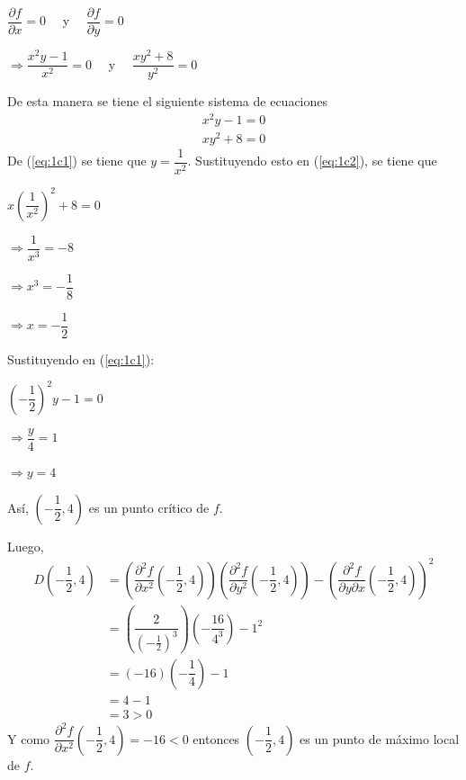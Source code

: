 \documentclass[fleqn, 12pt]{article}
\newcommand{\derivadaparcial}[2]{\dfrac{\partial {#1}}{\partial {#2}}}
\newcommand{\derivadaparcialn}[3]{\dfrac{\partial^{#3} {#1}}{\partial {#2}^{#3}}}
\newcommand{\derivadaparcialnd}[3]{\dfrac{\partial^{2} {#1}}{\partial {#3} \partial {#2}}}
\begin{document}
\begin{enumerate}
\begin{enumerate}
            $ \derivadaparcial{f}{x} = 0 \quad $ y $ \quad \derivadaparcial{f}{y} = 0 $

            $ \Longrightarrow \dfrac{x^2 y - 1}{x^2} = 0 \quad $ y $ \quad \dfrac{x y^2 + 8}{y^2} = 0 $

            De esta manera se tiene el siguiente sistema de ecuaciones
            \begin{align}
                x^2 y - 1 = 0 \label{eq:1c1} \\
                xy^2 + 8 = 0 \label{eq:1c2}
            \end{align}
            De (\ref{eq:1c1}) se tiene que $ y = \dfrac{1}{x^2} $. Sustituyendo esto en (\ref{eq:1c2}), se tiene que

            $ x \left( \dfrac{1}{x^2} \right)^2 + 8 = 0 $

            $ \Longrightarrow \dfrac{1}{x^3} = -8 $

            $ \Longrightarrow x^3 = -\dfrac{1}{8} $

            $ \Longrightarrow x = -\dfrac{1}{2} $

            Sustituyendo en (\ref{eq:1c1}): 

            $ \left( -\dfrac{1}{2} \right)^2 y - 1 = 0 $

            $ \Longrightarrow \dfrac{y}{4} = 1 $

            $ \Longrightarrow y = 4 $

            Así, $ \left( -\dfrac{1}{2}, 4 \right) $ es un punto crítico de $ f $.

            Luego, 
            \begin{align*}
                D \left( -\dfrac{1}{2}, 4 \right) &= \left( \derivadaparcialn{f}{x}{2} \left( -\dfrac{1}{2}, 4 \right) \right) \left( \derivadaparcialn{f}{y}{2} \left( -\dfrac{1}{2}, 4 \right) \right) - \left( \derivadaparcialnd{f}{x}{y} \left( -\dfrac{1}{2}, 4 \right) \right)^2 \\
                &= \left( \dfrac{2}{\left( -\frac{1}{2} \right)^3} \right) \left( - \dfrac{16}{4^3} \right) - 1^2 \\
                &= (-16) \left( - \dfrac{1}{4} \right) - 1 \\
                &= 4 - 1 \\
                &= 3 > 0
            \end{align*}
            Y como $ \derivadaparcialn{f}{x}{2} \left( -\dfrac{1}{2}, 4 \right) = -16 < 0 $ entonces $ \left( -\dfrac{1}{2}, 4 \right) $ es un punto de máximo local de $ f $.


\end{enumerate}
\end{enumerate}
\end{document}
